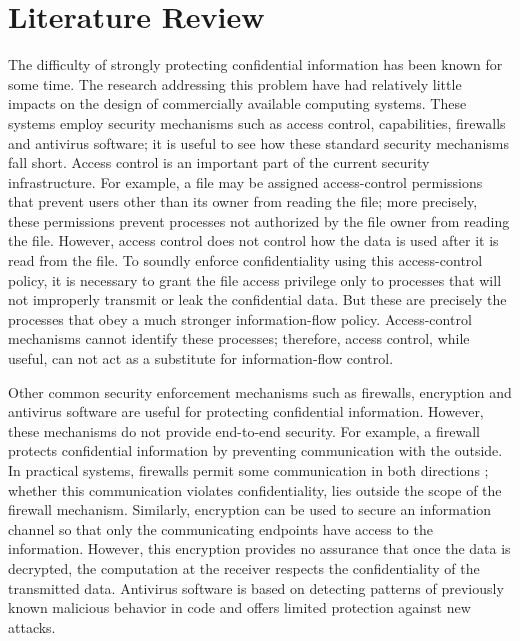 \chapter{Literature Review}

The difficulty of strongly protecting confidential
information has been known for some time. The research
addressing this problem have had relatively little impacts on the
design of commercially available computing systems. These
systems employ security mechanisms such as access control,
capabilities, firewalls and antivirus software; it is useful to see how these standard security mechanisms fall short. Access control is an important part of the current security infrastructure. For example, a file may be assigned access-control permissions that prevent users other than its owner from reading the file; more precisely, these permissions
prevent processes not authorized by the file owner from
reading the file. However, access control does not control how
the data is used after it is read from the file. To soundly enforce
confidentiality using this access-control policy, it is necessary
to grant the file access privilege only to processes that will
not improperly transmit or leak the confidential data. But
these are precisely the processes that obey a much stronger
information-flow policy. Access-control mechanisms cannot
identify these processes; therefore, access control, while useful,
can not act as a substitute for information-flow control. 

Other common security enforcement mechanisms such as
firewalls, encryption and antivirus software are useful for protecting
confidential information. However, these mechanisms
do not provide end-to-end security. For example, a firewall
protects confidential information by preventing communication
with the outside. In practical systems, firewalls
permit some communication in both directions \cite{ref_64_box2000simple};
whether this communication violates confidentiality, lies outside
the scope of the firewall mechanism. Similarly, encryption
can be used to secure an information channel so that only
the communicating endpoints have access to the information.
However, this encryption provides no assurance that once the
data is decrypted, the computation at the receiver respects the
confidentiality of the transmitted data. Antivirus software is
based on detecting patterns of previously known malicious
behavior in code and offers limited protection against
new attacks.

